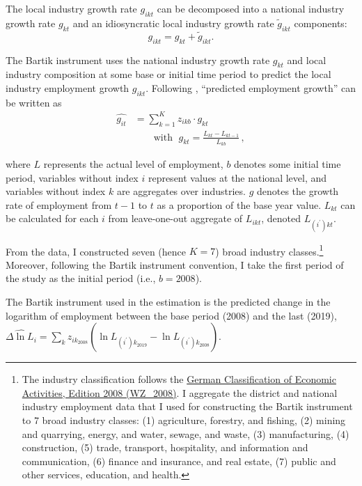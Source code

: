 \documentclass[
  12pt,
]{article}
\begin{document}
The local industry growth rate \(g_{ikt}\) can be decomposed into a
national industry growth rate \(g_{kt}\) and an idiosyncratic local
industry growth rate \(\widetilde{g}_{ikt}\) components:
\[g_{ikt} = g_{kt} + \widetilde{g}_{ikt}.\]

The Bartik instrument uses the national industry growth rate \(g_{kt}\)
and local industry composition at some base or initial time period to
predict the local industry employment growth \(g_{ikt}\). Following
\citet{bartik_1991}, ``predicted employment growth'' can be written as
\[
\begin{aligned}
\widehat{g_{it}} &=\sum_{k=1}^K z_{ikb}\cdot g_{kt}\\
&\quad\quad\text{with }\;g_{kt} = \frac{L_{kt} - L_{kt-1}}{L_{kb}}\,,
\end{aligned}
\]

where \(L\) represents the actual level of employment, \(b\) denotes
some initial time period, variables without index \(i\) represent values
at the national level, and variables without index \(k\) are aggregates
over industries. \(g\) denotes the growth rate of employment from
\(t-1\) to \(t\) as a proportion of the base year value. \(L_{kt}\) can
be calculated for each \(i\) from leave-one-out aggregate of
\(L_{ikt}\), denoted \(L_{(i^\prime)kt}\).

From the data, I constructed seven (hence \(K=7\)) broad industry
classes.\footnote{The industry classification follows the
  \href{https://www.destatis.de/DE/Methoden/Klassifikationen/Gueter-Wirtschaftsklassifikationen/klassifikation-wz-2008.html}{German
  Classification of Economic Activities, Edition 2008 (WZ\_2008)}. I
  aggregate the district and national industry employment data that I
  used for constructing the Bartik instrument to 7 broad industry
  classes: (1) agriculture, forestry, and fishing, (2) mining and
  quarrying, energy, and water, sewage, and waste, (3) manufacturing,
  (4) construction, (5) trade, transport, hospitality, and information
  and communication, (6) finance and insurance, and real estate, (7)
  public and other services, education, and health.} Moreover, following
the Bartik instrument convention, I take the first period of the study
as the initial period (i.e., \(b=2008\)).

The Bartik instrument used in the estimation is the predicted change in
the logarithm of employment between the base period (2008) and the last
(2019),
\(\widehat{\Delta\ln L_i} = \sum_k{z_{ik_2008} \left(\ln L_{(i^\prime)k_2019}-\ln L_{(i^\prime)k_2008}\right)}\).
\end{document}
